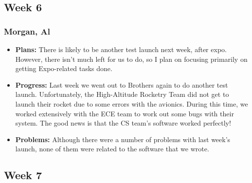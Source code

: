 \documentclass[10pt,draftclsnofoot,onecolumn]{IEEEtran}
\begin{document}
\subsection{Week 6}
\subsubsection{Morgan, Al}
\begin{itemize}
	\item \textbf{Plans: }
	There is likely to be another test launch next week, after expo. However, there isn't much left for us to do, so I plan on focusing primarily on getting Expo-related tasks done.
	\item \textbf{Progress: }
	Last week we went out to Brothers again to do another test launch. Unfortunately, the High-Altitude Rocketry Team did not get to launch their rocket due to some errors with the avionics. During this time, we worked extensively with the ECE team to work out some bugs with their system. The good news is that the CS team's software worked perfectly!
	\item \textbf{Problems: }
	Although there were a number of problems with last week's launch, none of them were related to the software that we wrote.
\end{itemize}

\subsection{Week 7}
\end{document}
